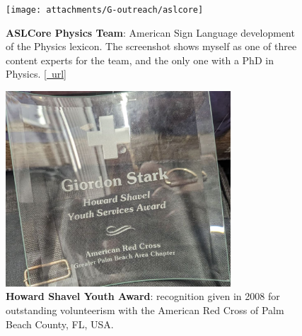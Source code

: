 
\begin{figure}[h!]
	\centering
	\caption{\textbf{ASLCore Physics Team}: American Sign Language development of the Physics lexicon. The screenshot shows myself as one of three content experts for the team, and the only one with a PhD in Physics. \href{https://aslcore.org}{[~url]}}
	\texttt{[image: attachments/G-outreach/aslcore]}
\end{figure}

\begin{figure}[h!]
	\centering
	\caption{\textbf{Howard Shavel Youth Award}: recognition given in 2008 for outstanding volunteerism with the American Red Cross of Palm Beach County, FL, USA.}
	\includegraphics[width=0.75\textwidth]{attachments/G-outreach/howardShavelYouthAward}
\end{figure}

